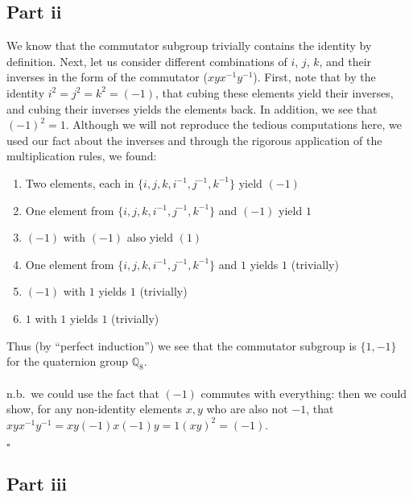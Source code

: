 \documentclass[letterpaper]{article}
\newcommand*{\QED}{\hfill\ensuremath{\square}}%
\begin{document}
\subsection{Part ii}
\label{subs:8Partii}

We know that the commutator subgroup trivially contains the identity by definition.
Next, let us consider different combinations of $ i $, $ j $, $ k $, and their inverses in the form of the commutator ($ xyx^{-1}y^{-1} $).
First, note that by the identity $ i^2 = j^2 = k^2 = (-1) $, that cubing these elements yield their inverses, and cubing their inverses yields the elements back.
In addition, we see that $ {(-1)}^2 = 1 $.
Although we will not reproduce the tedious computations here, we used our fact about the inverses and through the rigorous application of the multiplication rules, we found:
\begin{enumerate}
    \item Two elements, each in $ \{i, j, k, i^{-1}, j^{-1}, k^{-1} \} $ yield $ (-1) $
    \item One element from $ \{i, j, k, i^{-1}, j^{-1}, k^{-1} \} $ and $ (-1) $ yield $ 1 $
    \item $ (-1) $ with $ (-1) $ also yield $ (1) $
    \item One element from $ \{i, j, k, i^{-1}, j^{-1}, k^{-1} \} $ and $ 1 $ yields $ 1 $ (trivially)
    \item $ (-1) $ with $ 1 $ yields $ 1 $ (trivially)
    \item $ 1 $ with $ 1 $ yields $ 1 $ (trivially)
\end{enumerate}

Thus (by ``perfect induction'') we see that the commutator subgroup is $ \{1, -1\} $ for the quaternion group $ \mathbb{Q}_8 $.
\\ \\
n.b.\ we could use the fact that $ (-1) $ commutes with everything: then we could show, for any non-identity elements $ x, y $ who are also not $ -1 $, that $ xyx^{-1}y^{-1} = xy(-1)x(-1)y = 1{(xy)}^2 = (-1) $.

\QED{}

\subsection{Part iii}
\label{subs:8Partiii}
\end{document}
